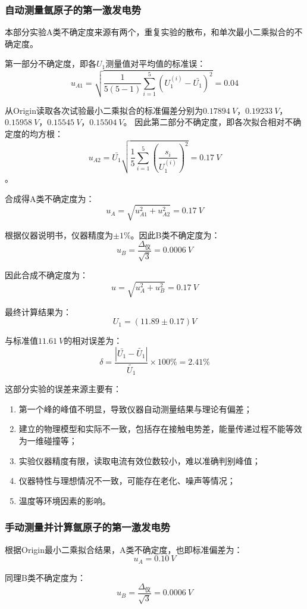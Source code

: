 \documentclass[]{../../templates/Report}%
\begin{document}
\begin{fullreportonly}
\subsubsection{自动测量氩原子的第一激发电势}
本部分实验A类不确定度来源有两个，重复实验的散布，和单次最小二乘拟合的不确定度。

第一部分不确定度，即各$U_1$测量值对平均值的标准误：
\[u_{A1} = \sqrt{\frac{1}{5(5-1)} \sum_{i=1}^{5} \left(U_1^{(i)} - \bar{U_1}\right)^2} = 0.04\]

从Origin读取各次试验最小二乘拟合的标准偏差分别为$\SI{0.17894}{V}$，$\SI{0.19233}{V}$，$\SI{0.15958}{V}$，$\SI{0.15545}{V}$，$\SI{0.15504}{V}$。
因此第二部分不确定度，即各次拟合相对不确定度的均方根：
\[u_{A2} = \bar{U_1} \sqrt{\frac{1}{5} \sum_{i=1}^{5} \left(\frac{s_i}{U_1^{(i)}}\right)^2} = \SI{0.17}{V}\]。

合成得A类不确定度为：
\[u_A = \sqrt{u_{A1}^2 + u_{A2}^2} = \SI{0.17}{V}\]

根据仪器说明书，仪器精度为$\pm 1\%$。因此B类不确定度为：
\[u_B = \frac{\Delta_\text{仪}}{\sqrt{3}} = \SI{0.0006}{V}\]

因此合成不确定度为：
\[u = \sqrt{u_A^2 + u_B^2} = \SI{0.17}{V}\]

最终计算结果为：
\[U_1 = (11.89 \pm 0.17)\si{V}\]

与标准值$\SI{11.61}{V}$的相对误差为：
\[\delta = \frac{\left|\bar{U_1} - \tilde{U_1}\right|}{\tilde{U_1}} \times 100 \% = 2.41\%\]

这部分实验的误差来源主要有：
\begin{enumerate}
    \item 第一个峰的峰值不明显，导致仪器自动测量结果与理论有偏差；
    \item 建立的物理模型和实际不一致，包括存在接触电势差，能量传递过程不能等效为一维碰撞等；
    \item 实验仪器精度有限，读取电流有效位数较小，难以准确判别峰值；
    \item 仪器特性与理想情况不一致，可能存在老化、噪声等情况；
    \item 温度等环境因素的影响。
\end{enumerate}

\subsubsection{手动测量并计算氩原子的第一激发电势}

根据Origin最小二乘拟合结果，A类不确定度，也即标准偏差为：
\[u_A = \SI{0.10}{V}\]

同理B类不确定度为：
\[u_B = \frac{\Delta_\text{仪}}{\sqrt{3}} = \SI{0.0006}{V}\]


\end{fullreportonly}
\end{document}
